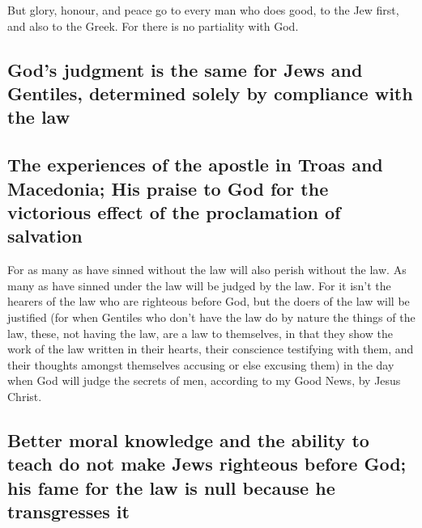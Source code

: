  But glory, honour, and peace go to every man who does
good, to the Jew first, and also to the Greek.  For there
is no partiality with God.

\hypertarget{gods-judgment-is-the-same-for-jews-and-gentiles-determined-solely-by-compliance-with-the-law}{%
\subsection{God's judgment is the same for Jews and Gentiles, determined
solely by compliance with the
law}\label{gods-judgment-is-the-same-for-jews-and-gentiles-determined-solely-by-compliance-with-the-law}}

\hypertarget{the-experiences-of-the-apostle-in-troas-and-macedonia-his-praise-to-god-for-the-victorious-effect-of-the-proclamation-of-salvation}{%
\subsection{The experiences of the apostle in Troas and Macedonia; His
praise to God for the victorious effect of the proclamation of
salvation}\label{the-experiences-of-the-apostle-in-troas-and-macedonia-his-praise-to-god-for-the-victorious-effect-of-the-proclamation-of-salvation}}

 For as many as have sinned without the law will also
perish without the law. As many as have sinned under the law will be
judged by the law.  For it isn't the hearers of the law
who are righteous before God, but the doers of the law will be justified
 (for when Gentiles who don't have the law do by nature
the things of the law, these, not having the law, are a law to
themselves,  in that they show the work of the law
written in their hearts, their conscience testifying with them, and
their thoughts amongst themselves accusing or else excusing them)
 in the day when God will judge the secrets of men,
according to my Good News, by Jesus Christ.

\hypertarget{better-moral-knowledge-and-the-ability-to-teach-do-not-make-jews-righteous-before-god-his-fame-for-the-law-is-null-because-he-transgresses-it}{%
\subsection{Better moral knowledge and the ability to teach do not make
Jews righteous before God; his fame for the law is null because he
transgresses
it}\label{better-moral-knowledge-and-the-ability-to-teach-do-not-make-jews-righteous-before-god-his-fame-for-the-law-is-null-because-he-transgresses-it}}

